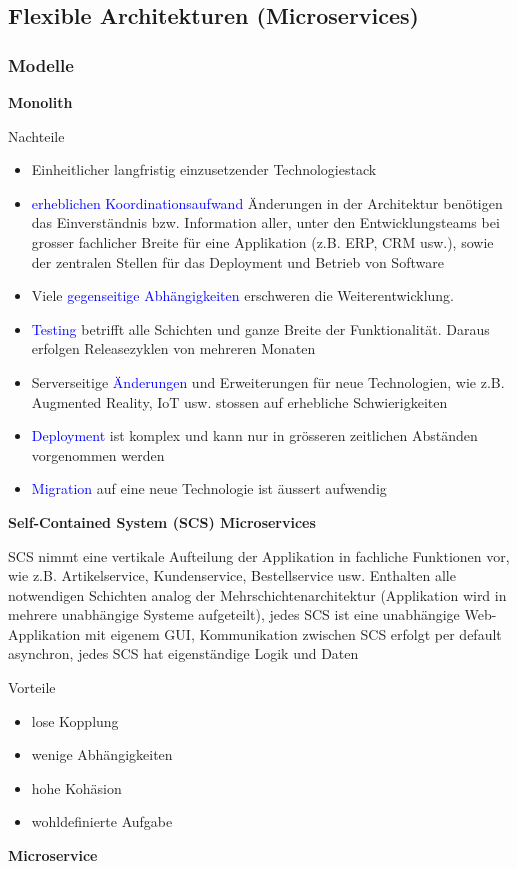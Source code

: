 \subsection{Flexible Architekturen (Microservices)}

\subsubsection{Modelle}

\textbf{Monolith}

Nachteile
\begin{itemize}
    \item Einheitlicher langfristig einzusetzender Technologiestack
    \item \textcolor{blue}{erheblichen Koordinationsaufwand} Änderungen in der Architektur benötigen das Einverständnis bzw. Information aller, unter den Entwicklungsteams bei grosser fachlicher Breite für eine Applikation (z.B. ERP, CRM usw.), sowie der zentralen Stellen für das Deployment und Betrieb von Software
    \item Viele \textcolor{blue}{gegenseitige Abhängigkeiten} erschweren die Weiterentwicklung.
    \item \textcolor{blue}{Testing} betrifft alle Schichten und ganze Breite der Funktionalität. Daraus erfolgen Releasezyklen von mehreren Monaten
    \item Serverseitige \textcolor{blue}{Änderungen} und Erweiterungen für neue Technologien, wie z.B. Augmented Reality, IoT usw. stossen auf erhebliche Schwierigkeiten
    \item \textcolor{blue}{Deployment} ist komplex und kann nur in grösseren zeitlichen Abständen vorgenommen werden
    \item \textcolor{blue}{Migration} auf eine neue Technologie ist äussert
    aufwendig
\end{itemize}
\vspace{10pt}
\textbf{Self-Contained System (SCS) Microservices}

SCS nimmt eine vertikale Aufteilung der Applikation in fachliche Funktionen vor, wie z.B. Artikelservice, Kundenservice, Bestellservice usw. Enthalten alle notwendigen Schichten analog der Mehrschichtenarchitektur (Applikation wird in mehrere unabhängige Systeme aufgeteilt), jedes SCS ist eine unabhängige Web-Applikation mit eigenem GUI, Kommunikation zwischen SCS erfolgt per default asynchron, jedes SCS hat eigenständige Logik und Daten

Vorteile
\begin{itemize}
    \item lose Kopplung
    \item wenige Abhängigkeiten
    \item hohe Kohäsion
    \item wohldefinierte Aufgabe
\end{itemize}
\vspace{10pt}
\textbf{Microservice}


